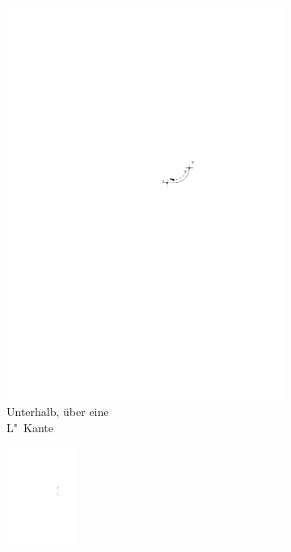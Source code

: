\documentclass[a4paper]{scrreprt}
\theoremstyle{definition}
\begin{document}
\begin{figure}[h]
\begin{subfigure}[b]{0.2\textwidth}
                \includegraphics[width=\textwidth]{schnitt_finden_bot_aboveL}
                \caption{Unterhalb, über eine \\ L"~Kante}
                \label{fig:cutfinding_bot_aboveL}
        \end{subfigure}
        \quad
        \begin{subfigure}[b]{0.2\textwidth}
                \includegraphics[width=0.25\textwidth]{schnitt_finden_bot_vertical}

\end{subfigure}
\end{figure}
\end{document}
